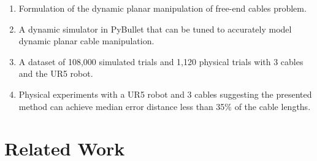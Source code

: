 \documentclass[letterpaper, 10 pt, conference]{ieeeconf}  %
\newcommand{\remark}[3]{{\color{#2}[#1: #3]}}
\newcommand{\daniel}[1]{\remark{Daniel}{blue}{#1}}
\newcommand{\Lawrence}[1]{\remark{Lawrence}{orange}{#1}}
\begin{document}
\begin{enumerate}
    \item Formulation of the dynamic planar manipulation of free-end cables problem.
    \item A dynamic simulator in PyBullet that can be tuned to accurately model dynamic planar cable manipulation.
    \item A dataset of 108,000 simulated trials and 1,120 physical trials with 3 cables and the UR5 robot.
    \item Physical experiments with a UR5 robot and 3 cables suggesting the presented method can achieve median error distance less than 35$\%$ of the cable lengths.%
\end{enumerate}
\section{Related Work}\label{sec:rw}


\end{document}
